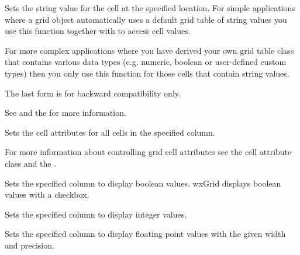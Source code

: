 Sets the string value for the cell at the specified location. For simple applications where a
grid object automatically uses a default grid table of string values you use this function together
with  to access cell values.

For more complex applications where you have derived your own grid table class that contains
various data types (e.g. numeric, boolean or user-defined custom types) then you only use this
function for those cells that contain string values.

The last form is for backward compatibility only.

See  
and the  for more information.



\label{wxgridsetcolattr}


Sets the cell attributes for all cells in the specified column.

For more information about controlling grid cell attributes see the 
 cell attribute class and the 
.



\label{wxgridsetcolformatbool}


Sets the specified column to display boolean values. wxGrid displays boolean values with a checkbox.



\label{wxgridsetcolformatnumber}


Sets the specified column to display integer values.



\label{wxgridsetcolformatfloat}


Sets the specified column to display floating point values with the given width and precision.



